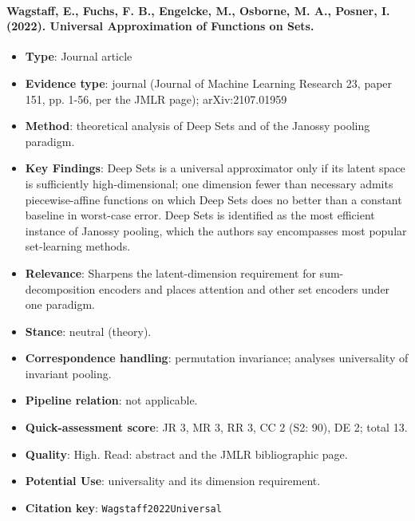 \documentclass[journal,onecolumn]{IEEEtran}
\begin{document}
\paragraph{Wagstaff, E., Fuchs, F. B., Engelcke, M., Osborne, M. A., Posner, I. (2022). Universal Approximation of Functions on Sets.~\cite{Wagstaff2022Universal}}\mbox{}

\begin{itemize}

\item{} \textbf{Type}: Journal article

\item{} \textbf{Evidence type}: journal (Journal of Machine Learning Research 23, paper 151, pp. 1-56, per the JMLR page); arXiv:2107.01959

\item{} \textbf{Method}: theoretical analysis of Deep Sets and of the Janossy pooling paradigm.

\item{} \textbf{Key Findings}: Deep Sets is a universal approximator only if its latent space is sufficiently high-dimensional; one dimension fewer than necessary admits piecewise-affine functions on which Deep Sets does no better than a constant baseline in worst-case error. Deep Sets is identified as the most efficient instance of Janossy pooling, which the authors say encompasses most popular set-learning methods.

\item{} \textbf{Relevance}: Sharpens the latent-dimension requirement for sum-decomposition encoders and places attention and other set encoders under one paradigm.

\item{} \textbf{Stance}: neutral (theory).

\item{} \textbf{Correspondence handling}: permutation invariance; analyses universality of invariant pooling.

\item{} \textbf{Pipeline relation}: not applicable.

\item{} \textbf{Quick-assessment score}: JR 3, MR 3, RR 3, CC 2 (S2: 90), DE 2; total 13.

\item{} \textbf{Quality}: High. Read: abstract and the JMLR bibliographic page.

\item{} \textbf{Potential Use}: universality and its dimension requirement.

\item{} \textbf{Citation key}: \texttt{Wagstaff2022Universal}

\end{itemize}
\end{document}
